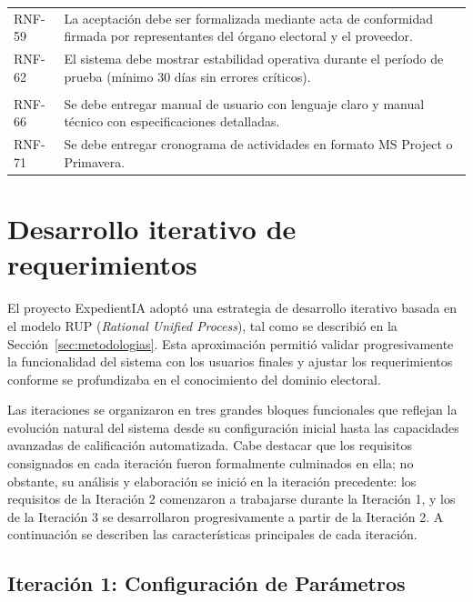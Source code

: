 \documentclass[12pt,a4paper,oneside]{book}
\begin{document}
\begin{table}[H]
\begin{tabular}{@{}>{\centering\arraybackslash}p{2cm}
                   >{\raggedright\arraybackslash}p{12.5cm}@{}}
RNF-59 & La aceptación debe ser formalizada mediante acta de conformidad firmada por representantes del órgano electoral y el proveedor. \\
RNF-62 & El sistema debe mostrar estabilidad operativa durante el período de prueba (mínimo 30 días sin errores críticos). \\[4pt]
\multicolumn{2}{@{}l}{\textbf{Documentación}} \\[2pt]
RNF-66 & Se debe entregar manual de usuario con lenguaje claro y manual técnico con especificaciones detalladas. \\
RNF-71 & Se debe entregar cronograma de actividades en formato MS Project o Primavera. \\
\bottomrule
\end{tabular}
\end{table}

\clearpage

\section{Desarrollo iterativo de requerimientos}
\label{sec:desarrollo-iterativo}

El proyecto ExpedientIA adoptó una estrategia de desarrollo iterativo basada en el modelo RUP (\textit{Rational Unified Process}), tal como se describió en la Sección~\ref{sec:metodologias}. Esta aproximación permitió validar progresivamente la funcionalidad del sistema con los usuarios finales y ajustar los requerimientos conforme se profundizaba en el conocimiento del dominio electoral.

Las iteraciones se organizaron en tres grandes bloques funcionales que reflejan la evolución natural del sistema desde su configuración inicial hasta las capacidades avanzadas de calificación automatizada. Cabe destacar que los requisitos consignados en cada iteración fueron formalmente culminados en ella; no obstante, su análisis y elaboración se inició en la iteración precedente: los requisitos de la Iteración 2 comenzaron a trabajarse durante la Iteración 1, y los de la Iteración 3 se desarrollaron progresivamente a partir de la Iteración 2. A continuación se describen las características principales de cada iteración.

\subsection{Iteración 1: Configuración de Parámetros}
\label{subsec:iteracion1-parametros}
\end{document}
